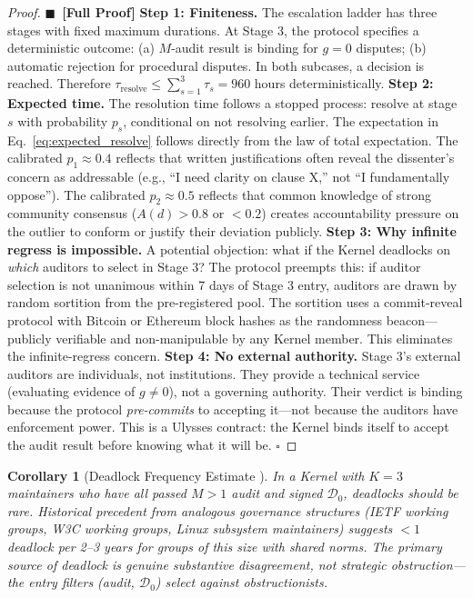 \documentclass[12pt,a4paper]{article}
\newtheorem{corollary}[theorem]{Corollary}
\theoremstyle{definition}
\newcommand{\rigorFull}[0]{$\blacksquare$~\textbf{[Full Proof]}}
\newcommand{\gzero}{g=0}
\newcommand{\gnonzero}{g \neq 0}
\newcommand{\GzeroDecl}{\mathcal{D}_{0}}
\begin{document}
\begin{proof}\rigorFull
\textbf{Step 1: Finiteness.} The escalation ladder has three stages with fixed maximum durations. At Stage 3, the protocol specifies a deterministic outcome: (a) $M$-audit result is binding for $\gzero$ disputes; (b) automatic rejection for procedural disputes. In both subcases, a decision is reached. Therefore $\tau_{\text{resolve}} \leq \sum_{s=1}^3 \tau_s = 960$ hours deterministically.
\textbf{Step 2: Expected time.} The resolution time follows a stopped process: resolve at stage $s$ with probability $p_s$, conditional on not resolving earlier. The expectation in Eq.~\eqref{eq:expected_resolve} follows directly from the law of total expectation. The calibrated $p_1 \approx 0.4$ reflects that written justifications often reveal the dissenter's concern as addressable (e.g., ``I need clarity on clause X,'' not ``I fundamentally oppose''). The calibrated $p_2 \approx 0.5$ reflects that common knowledge of strong community consensus ($A(d) > 0.8$ or $< 0.2$) creates accountability pressure on the outlier to conform or justify their deviation publicly.
\textbf{Step 3: Why infinite regress is impossible.} A potential objection: what if the Kernel deadlocks on \textit{which} auditors to select in Stage 3? The protocol preempts this: if auditor selection is not unanimous within 7 days of Stage 3 entry, auditors are drawn by random sortition from the pre-registered pool. The sortition uses a commit-reveal protocol with Bitcoin or Ethereum block hashes as the randomness beacon---publicly verifiable and non-manipulable by any Kernel member. This eliminates the infinite-regress concern.
\textbf{Step 4: No external authority.} Stage 3's external auditors are individuals, not institutions. They provide a technical service (evaluating evidence of $\gnonzero$), not a governing authority. Their verdict is binding because the protocol \textit{pre-commits} to accepting it---not because the auditors have enforcement power. This is a Ulysses contract: the Kernel binds itself to accept the audit result before knowing what it will be. $\square$
\end{proof}
\begin{corollary}[Deadlock Frequency Estimate ]
\label{cor:deadlock_freq}
In a Kernel with $K=3$ maintainers who have all passed $M>1$ audit and signed $\GzeroDecl$, deadlocks should be rare. Historical precedent from analogous governance structures (IETF working groups, W3C working groups, Linux subsystem maintainers) suggests $< 1$ deadlock per 2--3 years for groups of this size with shared norms. The primary source of deadlock is genuine substantive disagreement, not strategic obstruction---the entry filters (audit, $\GzeroDecl$) select against obstructionists.
\end{corollary}
\end{document}
